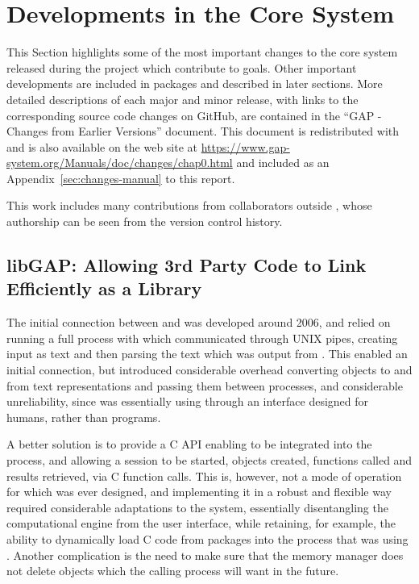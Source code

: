 \section{Developments in the Core \GAP System}\label{sec:core-gap}

This Section highlights some of the most important
changes to the core \GAP system released
during the project which contribute to \ODK goals. Other important developments are
included in \GAP packages and described in later sections.  More
detailed descriptions of each major and minor \GAP release, with links
to the corresponding source code changes on GitHub, are contained in
the ``GAP - Changes from Earlier Versions'' document. This document is
redistributed with \GAP and is also available on the \GAP web site at
\url{https://www.gap-system.org/Manuals/doc/changes/chap0.html} and
included as an Appendix~\ref{sec:changes-manual} to this report.

This work includes many contributions from collaborators outside \ODK,
whose authorship can be seen from the version control history.

\subsection{libGAP: Allowing 3rd Party Code to Link \GAP Efficiently as a Library}\label{libgap}

The initial connection between \Sage and \GAP was developed around
2006, and relied on running a full \GAP process with which \Sage
communicated through UNIX pipes, creating \GAP input as text and then parsing
the text which was output from \GAP. This enabled an initial connection, but
introduced considerable overhead converting objects to and from text
representations and passing them between processes, and considerable
unreliability, since \Sage was essentially using \GAP through an
interface designed for humans, rather than programs.

A better solution is to provide a C API enabling \GAP to be integrated
into the \Sage process, and allowing a \GAP session to be started,
objects created, functions called and results retrieved, via C function
calls. This is, however, not a mode of operation for which \GAP was
ever designed, and implementing it in a robust and flexible way
required considerable adaptations to the system, essentially
disentangling the computational engine from the user interface, while retaining,
for example, the ability to dynamically load C code from \GAP
packages into the process that was using . Another complication
is the need to make sure that the \GAP memory manager does not delete
objects which the calling process will want in the future.

